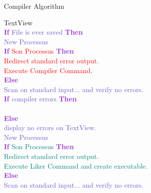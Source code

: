 \documentclass[11pt]{sample}
\renewcommand{\algorithmicif}      {\textbf{\textcolor{DarkOrchid}{If}}}
\renewcommand{\algorithmicelse}    {\textcolor{DarkOrchid}{\textbf{Else}}}
\renewcommand{\algorithmicthen}    {\textcolor{DarkOrchid}{\textbf{Then}}}
\begin{document}
\begin{algorithm}
  \caption{Compiler Algorithm}
  \begin{algorithmic}
    \REQUIRE TextView\\
    \algorithmicif{ \textcolor{SlateBlue}{File is ever saved}}
    \algorithmicthen{ \\  \hspace{4mm} \textcolor{SlateBlue}{ New Processus}}\\
    \hspace{4mm}\algorithmicif{ \textcolor{Red}{Son Processus} }\algorithmicthen\\
    \hspace{8mm} \textcolor{Red}{Redirect standard error output.}\\
    \hspace{8mm} \textcolor{Red}{Execute Compiler Command.}\\
    \hspace{4mm}\algorithmicelse\\
    \hspace{8mm} \textcolor{SlateBlue}{ Scan on standard input... and verify no errors.}\\
    \hspace{8mm}\algorithmicif{ \textcolor{SlateBlue}{ compiler errors }}\algorithmicthen\\
    \hspace{12mm \textcolor{SlateBlue}{display errors on TextView.}}\\
    \hspace{8mm}\algorithmicelse\\
    \hspace{12mm} \textcolor{SlateBlue}{display no errors on TextView.}\\
    \hspace{12mm} \textcolor{SlateBlue}{ New Processus}\\
    \hspace{12mm}\algorithmicif{ \textcolor{Teal}{Son Processus} }\algorithmicthen\\
    \hspace{16mm} \textcolor{Teal}{ Redirect standard error output.}\\
    \hspace{16mm}  \textcolor{Teal}{Execute Liker Command and create executable.}\\
    \hspace{12mm}\algorithmicelse\\
    \hspace{16mm} \textcolor{SlateBlue}{ Scan on standard input... and verify no errors.}\\

\end{algorithmic}
\end{algorithm}
\end{document}
